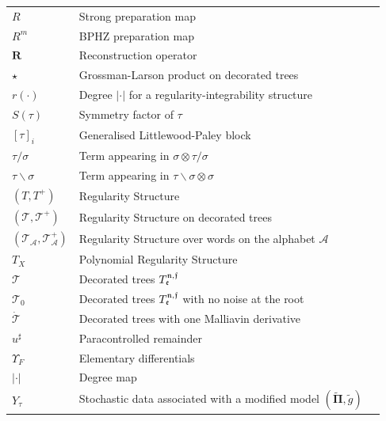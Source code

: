 \documentclass[11pt]{preprint}
\newcommand{\mcT}{\mathcal{T}}
\def\PPi{\boldsymbol{\Pi}}
\begin{document}
\begin{appendix}
\begin{center}
\begin{longtable}{lll}
	 $R$   & Strong preparation map & \pageref{eq_DeltaRTau} 
	  \\
	  $R^m$ & BPHZ preparation map & \pageref{BPHZ_preparation}
	  \\
	  ${\bm R}$ & Reconstruction operator  & \pageref{reconstrcution_op}
	  \\
	 $ \star $ & Grossman-Larson product on decorated trees  & \pageref{star_product}
	  \\
	 $r(\cdot)$ & Degree $|\cdot|$ for a regularity-integrability structure   & \pageref{integrability}
	  \\
$S(\tau)$	&  Symmetry factor of $\tau$  &  \pageref{symmetry_factor}
		\\
	$[\tau]_i$	& Generalised Littlewood-Paley block & \pageref{subsect_modifmodel}
	\\
 $\tau/\sigma $ & Term appearing in 	$\sigma \otimes  \tau/\sigma $ & \pageref{subsection_basicsRS}
		\\
		$\tau \backslash \sigma $ & Term appearing in 	$  \tau \backslash \sigma \otimes \sigma $ & \pageref{eq_sigmabackslashtau}
		\\
		 $(T,T^+)$ & Regularity Structure  & \pageref{subsection_basicsRS}
		 \\
	 $ (\mathcal{T},\mathcal{T}^+) $ & Regularity Structure on decorated trees  &	 \pageref{subsection_DecoratedTrees}
		 \\
		$ (\mathcal{T}_{\mathcal{A}}, \mathcal{T}_{\mathcal{A}}^+)$ & Regularity Structure over words on the alphabet $ \mathcal{A} $  & \pageref{def_model_words}
		 	\\
		 $T_X$ & Polynomial Regularity Structure  & \pageref{subsection_basicsRS}
		 \\
	$\mcT$	 & Decorated trees $T_{\frak e}^{\frak n, \frak f} $ & \pageref{subsection_DecoratedTrees}		
		 \\
		 $\mcT_0$	 & Decorated trees $T_{\frak e}^{\frak n, \frak f}$ with no noise at the root  & \pageref{subsection_DecoratedTrees}	
		 \\
		 $\dot{\mcT}$	 & Decorated trees with one Malliavin derivative  & \pageref{D_Xi}	
		 \\
		 $ u^{\sharp} $ & Paracontrolled remainder  & \pageref{eq_pamansatz}
		 \\
		 $ \Upsilon_F $ & Elementary differentials &  \pageref{subsec_subcriticality}
		 \\ $|\cdot|$ & Degree map & \pageref{subsection_basicsRS}
		 \\ $Y_{\tau}$ & Stochastic data associated with a modified model $ (\widetilde{\PPi}, \widetilde{g})$ & \pageref{eqdef_Ztau1}

\end{longtable}
\end{center}
\end{appendix}
\end{document}
